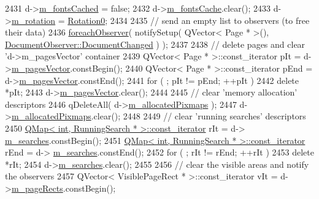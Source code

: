 \begin{DoxyCode}
2431     d->\hyperlink{classOkular_1_1DocumentPrivate_aa33ab887df80e7df7c9d7a5eecff000e}{m\_fontsCached} = \textcolor{keyword}{false};
2432     d->\hyperlink{classOkular_1_1DocumentPrivate_a9be70502279da0a275889e504409c7e5}{m\_fontsCache}.clear();
2433     d->\hyperlink{classOkular_1_1DocumentPrivate_a5b7f4c2b5937d311b277c2e90826ee1b}{m\_rotation} = \hyperlink{namespaceOkular_a8556d00465f61ef533c6b027669e7da6aa4df8fc3dd09e30520c264c8d23d89c2}{Rotation0};
2434 
2435     \textcolor{comment}{// send an empty list to observers (to free their data)}
2436     \hyperlink{core_2document_8cpp_a67e536532b9ae1f36450a4ebff082fea}{foreachObserver}( notifySetup( QVector< Page * >(), 
      \hyperlink{classOkular_1_1DocumentObserver_aba00584af99894f95a9650e91f109d40ae599564392c01b22e96eff7602c4dd03}{DocumentObserver::DocumentChanged} ) );
2437 
2438     \textcolor{comment}{// delete pages and clear 'd->m\_pagesVector' container}
2439     QVector< Page * >::const\_iterator pIt = d->\hyperlink{classOkular_1_1DocumentPrivate_a73b852d9a73ffe8061b66dbf9b290f17}{m\_pagesVector}.constBegin();
2440     QVector< Page * >::const\_iterator pEnd = d->\hyperlink{classOkular_1_1DocumentPrivate_a73b852d9a73ffe8061b66dbf9b290f17}{m\_pagesVector}.constEnd();
2441     \textcolor{keywordflow}{for} ( ; pIt != pEnd; ++pIt )
2442         \textcolor{keyword}{delete} *pIt;
2443     d->\hyperlink{classOkular_1_1DocumentPrivate_a73b852d9a73ffe8061b66dbf9b290f17}{m\_pagesVector}.clear();
2444 
2445     \textcolor{comment}{// clear 'memory allocation' descriptors}
2446     qDeleteAll( d->\hyperlink{classOkular_1_1DocumentPrivate_a13e55dcfc91cfbe1ff91a55312f3e39f}{m\_allocatedPixmaps} );
2447     d->\hyperlink{classOkular_1_1DocumentPrivate_a13e55dcfc91cfbe1ff91a55312f3e39f}{m\_allocatedPixmaps}.clear();
2448 
2449     \textcolor{comment}{// clear 'running searches' descriptors}
2450     \hyperlink{classQMap}{QMap< int, RunningSearch * >::const\_iterator} rIt = d->
      \hyperlink{classOkular_1_1DocumentPrivate_a42420dd45075092b921a829b8e9f2214}{m\_searches}.constBegin();
2451     \hyperlink{classQMap}{QMap< int, RunningSearch * >::const\_iterator} rEnd = d->
      \hyperlink{classOkular_1_1DocumentPrivate_a42420dd45075092b921a829b8e9f2214}{m\_searches}.constEnd();
2452     \textcolor{keywordflow}{for} ( ; rIt != rEnd; ++rIt )
2453         \textcolor{keyword}{delete} *rIt;
2454     d->\hyperlink{classOkular_1_1DocumentPrivate_a42420dd45075092b921a829b8e9f2214}{m\_searches}.clear();
2455 
2456     \textcolor{comment}{// clear the visible areas and notify the observers}
2457     QVector< VisiblePageRect * >::const\_iterator vIt = d->\hyperlink{classOkular_1_1DocumentPrivate_a2d167614d4dc602ada64ab925cee6dce}{m\_pageRects}.constBegin();

\end{DoxyCode}
